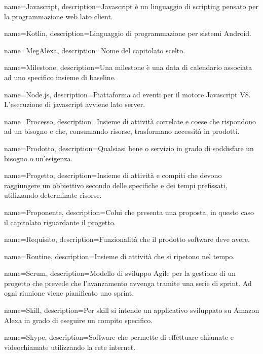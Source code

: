 {
name={Javascript},
description={Javascript è un linguaggio di scripting pensato per la programmazione web lato client.}
}

{
name={Kotlin},
description={Linguaggio di programmazione per sistemi Android.}
}

{
name={MegAlexa},
description={Nome del capitolato scelto.}
}

{
name={Milestone},
description={Una milestone è una data di calendario associata ad uno specifico insieme di baseline.}
}

{
name={Node.js},
description={Piattaforma ad eventi per il motore Javascript V8. L’esecuzione di javascript avviene lato server.}
}

{
name={Processo},
description={Insieme di attività correlate e coese che rispondono ad un bisogno e che, consumando risorse, trasformano necessità in prodotti.}
}

{
name={Prodotto},
description={Qualsiasi bene o servizio in grado di soddisfare un bisogno o un’esigenza.}
}

{
name={Progetto},
description={Insieme di attività e compiti che devono raggiungere un obbiettivo secondo delle specifiche e dei tempi prefissati, utilizzando determinate risorse.}
}

{
name={Proponente},
description={Colui che presenta una proposta, in questo caso il capitolato riguardante il progetto.}
}

{
name={Requisito},
description={Funzionalità che il prodotto software deve avere.}
}

{
name={Routine},
description={Insieme di attività che si ripetono nel tempo.}
}

{
name={Scrum},
description={Modello di sviluppo Agile per la gestione di un progetto che prevede che l’avanzamento avvenga tramite una serie di sprint. Ad ogni riunione viene pianificato uno sprint.}
}

{
name={Skill},
description={Per skill si intende un applicativo sviluppato su Amazon Alexa in grado di eseguire un compito specifico.}
}

{
name={Skype},
description={Software che permette di effettuare chiamate e videochiamate utilizzando la rete internet.}
}

